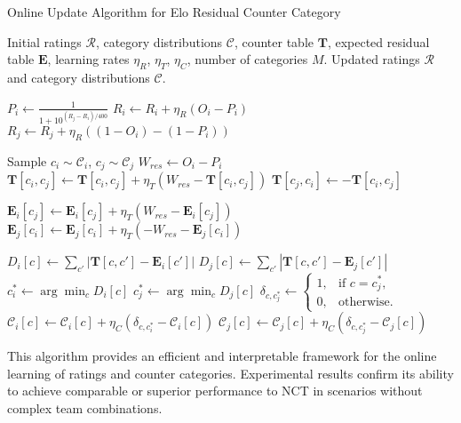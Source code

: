 \begin{algorithm}
\caption{Online Update Algorithm for Elo Residual Counter Category}
\label{alg:EloRCC}
\begin{algorithmic}[1]
\Require Initial ratings $\mathcal{R}$, category distributions $\mathcal{C}$, counter table $\mathbf{T}$, expected residual table $\mathbf{E}$, learning rates $\eta_R$, $\eta_T$, $\eta_C$, number of categories $M$.
\Ensure Updated ratings $\mathcal{R}$ and category distributions $\mathcal{C}$.

    \State $P_i \gets \frac{1}{1 + 10^{(R_j - R_i)/400}}$
    \State $R_i \gets R_i + \eta_R (O_i - P_i)$
    \State $R_j \gets R_j + \eta_R ((1 - O_i) - (1 - P_i))$

    \State Sample $c_i \sim \mathcal{C}_i$, $c_j \sim \mathcal{C}_j$
    \State $W_{res} \gets O_i - P_i$
    \State $\mathbf{T}[c_i, c_j] \gets \mathbf{T}[c_i, c_j] + \eta_T (W_{res} - \mathbf{T}[c_i, c_j])$
    \State $\mathbf{T}[c_j, c_i] \gets -\mathbf{T}[c_i, c_j]$

    \State $\mathbf{E}_i[c_j] \gets \mathbf{E}_i[c_j] + \eta_T (W_{res} - \mathbf{E}_i[c_j])$
    \State $\mathbf{E}_j[c_i] \gets \mathbf{E}_j[c_i] + \eta_T (-W_{res} - \mathbf{E}_j[c_i])$

    \State $D_i[c] \gets \sum_{c'} |\mathbf{T}[c, c'] - \mathbf{E}_i[c']|$
    \State $D_j[c] \gets \sum_{c'} |\mathbf{T}[c, c'] - \mathbf{E}_j[c']|$
    \State $c_i^* \gets \arg\min_c D_i[c]$
    \State $c_j^* \gets \arg\min_c D_j[c]$
    \State $\delta_{c, c_j^*} \gets 
    \begin{cases} 
    1, & \text{if } c = c_j^*, \\ 
    0, & \text{otherwise}.
    \end{cases}$
    \State $\mathcal{C}_i[c] \gets \mathcal{C}_i[c] + \eta_C (\delta_{c, c_i^*} - \mathcal{C}_i[c])$
    \State $\mathcal{C}_j[c] \gets \mathcal{C}_j[c] + \eta_C (\delta_{c, c_j^*} - \mathcal{C}_j[c])$
\EndFor
\end{algorithmic}
\end{algorithm}



This algorithm provides an efficient and interpretable framework for the online learning of ratings and counter categories. Experimental results confirm its ability to achieve comparable or superior performance to NCT in scenarios without complex team combinations.

